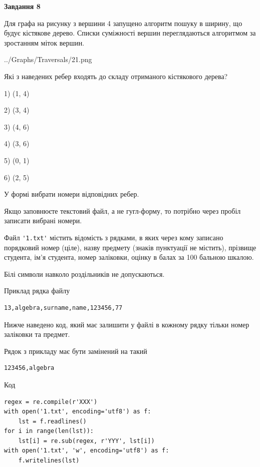 \documentclass[12pt, ukrainian]{article}
\def\code#1{\Verb!#1!}
\begin{document}
{\begin {large}
{\begin {center}\textbf{Завдання 8}\end {center}}\par
Для графа на рисунку з вершини 4 запущено алгоритм пошуку в ширину, що будує кістякове дерево. Списки суміжності вершин переглядаються алгоритмом за зростанням міток вершин.\par
\begin{center}
	{../Graphs/Traversals/21.png}
\end{center}
\par Які з наведених ребер входять до складу отриманого кістякового дерева?\par
1) (1, 4)\par
2) (3, 4)\par
3) (4, 6)\par
4) (3, 6)\par
5) (0, 1)\par
6) (2, 5)\par
{\vskip 15pt} У формі вибрати номери відповідних ребер.


Якщо заповнюєте текстовий файл, а не гугл-форму, то потрібно через пробіл записа\-ти вибрані номери.\par
\newpage


Файл \code{'1.txt'} містить відомість з рядками, в яких через кому записано поряд\-ковий номер (ціле), назву предмету (знаків пунктуації не містить), прізвище студента, ім'я студента, номер заліковки, оцінку в балах за 100 бальною шкалою.

Білі символи навколо роздільників не допускаються.

Приклад рядка файлу



\begin{verbatim}
13,algebra,surname,name,123456,77
\end{verbatim}


Нижче наведено код, який має залишити у файлі в кожному рядку тільки номер заліковки та предмет.

Рядок з прикладу має бути замінений на такий



\begin{verbatim}
123456,algebra
\end{verbatim}




Код



\begin{verbatim}
regex = re.compile(r'XXX')
with open('1.txt', encoding='utf8') as f:
    lst = f.readlines()
for i in range(len(lst)):
    lst[i] = re.sub(regex, r'YYY', lst[i])
with open('1.txt', 'w', encoding='utf8') as f:
    f.writelines(lst)
\end{verbatim}







\end{large}}
\end{document}
